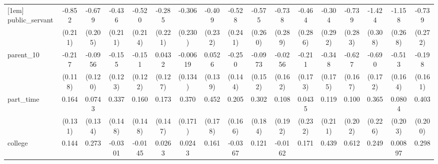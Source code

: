 {\begin{tabular}{l*{16}{c}}
[1em]
public\_servant      &      -0.852\sym{***}&      -0.679\sym{***}&      -0.436\sym{*}  &      -0.520\sym{*}  &      -0.285         &      -0.306         &      -0.409         &      -0.528\sym{*}  &      -0.575\sym{*}  &      -0.738\sym{*}  &      -0.464         &      -0.304         &      -0.739\sym{**} &      -1.424\sym{***}&      -1.158\sym{***}&      -0.739\sym{**} \\
                    &     (0.211)         &     (0.205)         &     (0.211)         &     (0.214)         &     (0.221)         &     (0.230)         &     (0.232)         &     (0.241)         &     (0.260)         &     (0.289)         &     (0.286)         &     (0.292)         &     (0.283)         &     (0.308)         &     (0.268)         &     (0.272)         \\
[1em]
parent\_10           &      -0.217         &     -0.0956         &      -0.155         &      -0.151         &      0.0432         &    -0.00619         &      0.0526         &      -0.250         &     -0.0973         &     -0.0256         &      -0.211         &      -0.348\sym{*}  &      -0.627\sym{***}&      -0.690\sym{***}&      -0.513\sym{**} &      -0.198         \\
                    &     (0.118)         &     (0.120)         &     (0.123)         &     (0.122)         &     (0.127)         &     (0.134)         &     (0.139)         &     (0.144)         &     (0.152)         &     (0.162)         &     (0.173)         &     (0.175)         &     (0.167)         &     (0.172)         &     (0.164)         &     (0.161)         \\
[1em]
part\_time           &       0.164         &      0.0743         &       0.337\sym{*}  &       0.160         &       0.173         &       0.370\sym{*}  &       0.452\sym{*}  &       0.205         &       0.302         &       0.108         &      0.0435         &       0.119         &       0.100         &       0.365         &      0.0804         &       0.403\sym{*}  \\
                    &     (0.131)         &     (0.134)         &     (0.148)         &     (0.148)         &     (0.147)         &     (0.171)         &     (0.178)         &     (0.166)         &     (0.184)         &     (0.192)         &     (0.232)         &     (0.211)         &     (0.202)         &     (0.226)         &     (0.203)         &     (0.200)         \\
[1em]
college             &       0.144         &       0.273         &     -0.0301         &     -0.0145         &      0.0263         &      0.0243         &       0.161         &     -0.0367         &       0.121         &     -0.0162         &       0.171         &       0.439\sym{*}  &       0.612\sym{**} &       0.249         &     0.00897         &       0.298         \\

\end{tabular}}
